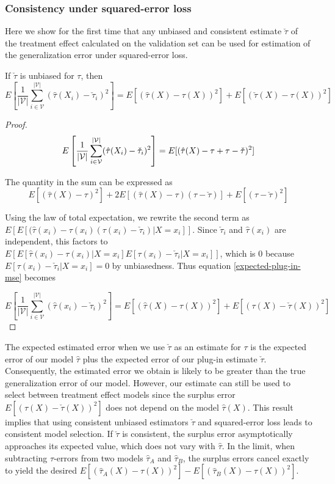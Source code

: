 \subsubsection{Consistency under squared-error loss}

Here we show for the first time that any unbiased and consistent estimate $\check\tau$ of the treatment effect calculated on the validation set can be used for estimation of the generalization error under squared-error loss. 

\begin{theorem}
If $\check\tau$ is unbiased for $\tau$, then 
\[
E\left[\frac{1}{|\mathcal{V}|}\sum_{i \in \mathcal{V}}^{|\mathcal{V}|}  (\hat \tau(X_i) - \check \tau_i)^2\right] = E[(\hat\tau(X) - \tau(X))^2] + E[(\check\tau(X) - \tau(X))^2]
\]
\end{theorem}

\begin{proof}
\begin{equation}
	E\left[ \frac{1}{|\mathcal{V}|}\sum_{i \in \mathcal{V}}^{|\mathcal{V}|}  (\hat \tau(X_i) - \check \tau_i)^2 \right]  
	= 
	E[ (\hat \tau(X) - \tau + \tau  - \check \tau)^2 ] \\
\label{expected-plug-in-mse}
\end{equation}

The quantity in the sum can be expressed as
\[
E[ (\hat \tau(X) - \tau)^2] + 2E[(\hat \tau(X) - \tau)(\tau - \check\tau)] + E[(\tau - \check\tau)^2]
\]

Using the law of total expectation, we rewrite the second term as $E[E[(\hat \tau(x_i) - \tau(x_i)(\tau(x_i) - \check\tau_i)|X=x_i]]$. Since $\check\tau_i$ and $\hat\tau(x_i)$ are independent, this factors to $E[E[\hat \tau(x_i) - \tau(x_i)|X=x_i]E[\tau(x_i) - \check\tau_i|X=x_i]]$, which is $0$ because $E[\tau(x_i) - \check\tau_i|X=x_i] = 0$ by unbiasedness. Thus equation \ref{expected-plug-in-mse} becomes

\[
	E\left[ \frac{1}{|\mathcal{V}|}\sum_{i \in \mathcal{V}}^{|\mathcal{V}|}  (\hat \tau(x_i) - \check \tau_i)^2 \right]  
	=
	E[ (\hat \tau(X) - \tau(X))^2] + E[(\tau(X) - \check\tau(X))^2]
\]

\end{proof}

The expected estimated error when we use $\check\tau$ as an estimate for $\tau$ is the expected error of our model $\hat\tau$ plus the expected error of our plug-in estimate $\check\tau$. Consequently, the estimated error we obtain is likely to be greater than the true generalization error of our model. However, our estimate can still be used to select between treatment effect models since the surplus error $E[(\tau(X) - \check\tau(X))^2]$ does not depend on the model $\hat \tau(X)$. This result implies that using consistent unbiased estimators $\check\tau$ and squared-error loss leads to consistent model selection. If $\check\tau$ is consistent, the surplus error asymptotically approaches its expected value, which does not vary with $\hat\tau$. In the limit, when subtracting $\tau$-errors from two models $\hat\tau_A$ and $\hat\tau_B$, the surplus errors cancel exactly to yield the desired $E[ (\hat \tau_A(X) - \tau(X))^2] - E[ (\hat \tau_B(X) - \tau(X))^2]$.

